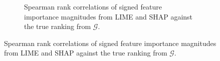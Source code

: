 \documentclass[10pt,a4paper]{article}
\begin{document}
\begin{figure}[ht!]
\begin{subfigure}{.3\textwidth}
              \caption{Spearman rank correlations of signed feature importance magnitudes from LIME and SHAP against the true ranking from $\mathcal{G}$.}
               \label{fig:lime_shap_Spearman_signed}
            \end{subfigure}


            
        \end{figure}
	
\end{document}
